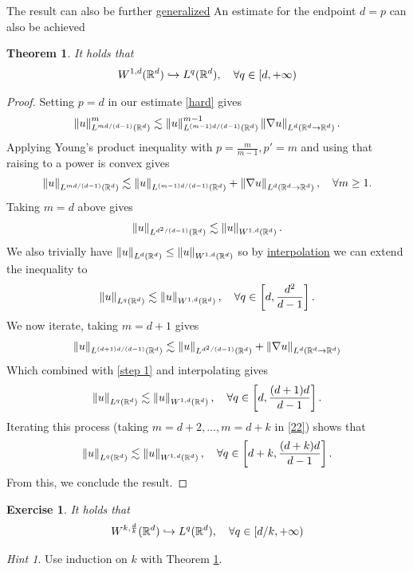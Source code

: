 \documentclass[12pt]{article}
\newtheorem{theorem}{Theorem}
\newtheorem{exercise}{Exercise}
\theoremstyle{remark}
\newtheorem*{hint}{Hint}
\renewcommand{\norm}[1]{\left\lVert #1 \right\rVert}\renewcommand{\abs}[1]{\left| #1 \right|}
\begin{document}
The result can also be further \href{https://en.wikipedia.org/wiki/Gagliardo%E2%80%93Nirenberg_interpolation_inequality}{generalized}
An estimate for the endpoint $d=p$ can also be achieved
\begin{theorem}\label{estt2}
	It holds that
	\begin{align*}
		W^{1,d}(\mathbb{R}^d) \hookrightarrow L^q(\mathbb{R}^d) , \quad\forall  q \in [d,+\infty)
	\end{align*}
\end{theorem}
\begin{proof}
	Setting $p=d$ in our estimate  \eqref{hard} gives
	\begin{align*}
		\norm{u}_{L^{ m d/(d-1)}(\R^d)}^{m}\lesssim  \norm{u}_{L^{(m-1)d /(d-1)}(\R^d)}^{m-1}\norm{\nabla u}_{L^{d}(\R^d \to  \R^d)} .
	\end{align*}
	Applying Young's product inequality with $p = \frac{m}{m-1}, p'= m$ and using that raising to a power is convex gives
	\begin{align}\label{22}
		\norm{u}_{L^{ m d/(d-1)}(\R^d)}\lesssim \norm{u}_{L^{(m-1)d/(d-1)}(\R^d)}+\norm{\nabla u}_{L^{d}(\R^d \to  \R^d)} , \quad\forall  m \geq 1.
	\end{align}
	Taking $m=d$ above gives
	\begin{align*}
		\norm{u}_{L^{d^2 /(d-1)}(\R^d)} \lesssim  \norm{u}_{W^{1,d}(\R^d)}.
	\end{align*}
	We also trivially have $\norm{u}_{L^d(\R^d)} \leq\norm{u}_{W^{1,d}(\R^d)} $ so by \href{https://en.wikipedia.org/wiki/Riesz%E2%80%93Thorin_theorem#:~:text=%5Bedit%5D-,First,-we%20need%20the}{interpolation} we can extend the inequality to
	\begin{align}\label{step 1}
		\norm{u}_{L^{q}(\R^d)} \lesssim  \norm{u}_{W^{1,d}(\R^d)} , \quad\forall q \in \qb{d,\frac{d^2}{d-1}}.
	\end{align}
	We now iterate, taking $m=d+1$ gives
	\begin{align*}
		\norm{u}_{L^{ (d+1)d/(d-1)}(\R^d)}\lesssim \norm{u}_{L^{d^2/(d-1)}(\R^d)}+\norm{\nabla u}_{L^{d}(\R^d \to  \R^d)}             \end{align*}
	Which combined with \eqref{step 1} and interpolating gives
	\begin{align*}
		\norm{u}_{L^{q}(\R^d)} \lesssim  \norm{u}_{W^{1,d}(\R^d)} , \quad\forall q \in \qb{d,\frac{(d+1)d}{d-1}}.
	\end{align*}
	Iterating this process (taking $m=d+2,\ldots, m=d+k$ in \eqref{22}) shows that    \begin{align*}
		\norm{u}_{L^{q}(\R^d)} \lesssim  \norm{u}_{W^{1,d}(\R^d)} , \quad\forall q \in \qb{d+k,\frac{(d+k)d}{d-1}}.
	\end{align*}
	From this, we conclude the result.     \end{proof}
\begin{exercise}\label{est22}
	It holds that
	\begin{align*}
		W^{k,\frac{d}{k}}(\mathbb{R}^d) \hookrightarrow L^q(\mathbb{R}^d) , \quad\forall  q \in [d /k,+\infty)
	\end{align*}
\end{exercise}
\begin{hint}
	Use induction on $k$  with Theorem \ref{estt2}.
\end{hint}
\end{document}
